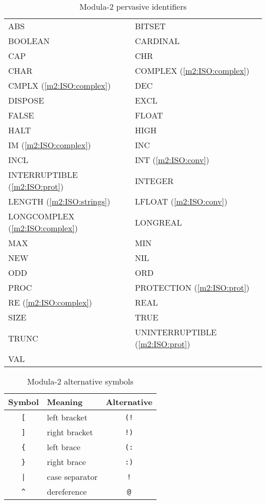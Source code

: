 \begin{table}[hbtp]
\begin{center}
\begin{tabular}{p{5.0cm}p{5.0cm}}
ABS             & BITSET    \\
BOOLEAN         & CARDINAL  \\
CAP             & CHR             \\
CHAR            & COMPLEX (\ref{m2:ISO:complex})  \\
CMPLX (\ref{m2:ISO:complex})  &  DEC             \\
DISPOSE         & EXCL            \\
FALSE           & FLOAT     \\
HALT            & HIGH      \\
IM (\ref{m2:ISO:complex})       & INC             \\
INCL            & INT (\ref{m2:ISO:conv})      \\
INTERRUPTIBLE (\ref{m2:ISO:prot})  & INTEGER   \\
LENGTH (\ref{m2:ISO:strings})   & LFLOAT (\ref{m2:ISO:conv})         \\
LONGCOMPLEX (\ref{m2:ISO:complex})    & LONGREAL  \\
MAX             & MIN             \\
NEW             & NIL             \\
ODD             & ORD             \\
PROC            & PROTECTION (\ref{m2:ISO:prot})     \\
RE (\ref{m2:ISO:complex})       & REAL            \\
SIZE            & TRUE      \\
TRUNC           & UNINTERRUPTIBLE (\ref{m2:ISO:prot}) \\
VAL              \\
\end{tabular}
\end{center}
\caption{Modula-2 pervasive identifiers}\label{table:m2:ISO:pervasive}
\end{table}

\begin{table}[htbp]
\begin{center}
\begin{tabular}{clc}
\bf Symbol  & \bf Meaning    & \bf Alternative  \\
\hline
  \verb+[+  & left bracket   & \verb+(!+        \\
  \verb+]+  & right bracket  & \verb+!)+        \\
  \verb+{+  & left brace     & \verb+(:+        \\
  \verb+}+  & right brace    & \verb+:)+        \\
  \verb+|+  & case separator & \verb+!+         \\
  \verb+^+  & dereference    & \verb+@+         \\
\end{tabular}
\end{center}
\caption{Modula-2 alternative symbols}\label{table:m2:ISO:alt}
\end{table}

